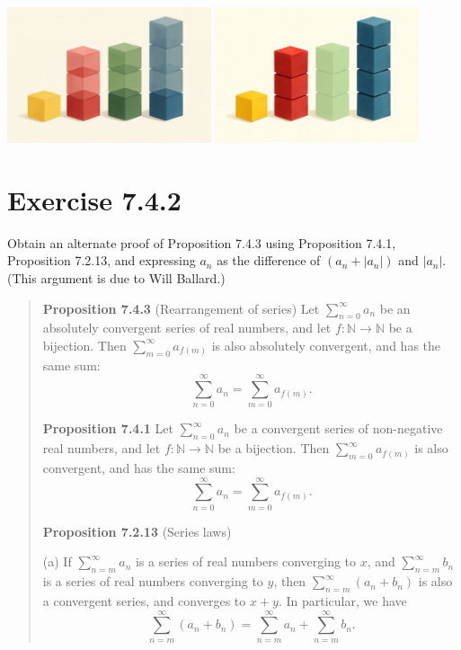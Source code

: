 \documentclass{article}
\begin{document}
\includegraphics[width=0.45\textwidth]{count-by-layer.png}
\hfil
\includegraphics[width=0.45\textwidth]{count-by-pile.png}

\section{Exercise 7.4.2}
Obtain an alternate proof of Proposition 7.4.3 using Proposition 7.4.1,
Proposition 7.2.13, and expressing $a_n$ as the difference of $(a_n + |a_n|)$
and $|a_n|$. (This argument is due to Will Ballard.)

\begin{quotation}
    \textbf{Proposition 7.4.3} (Rearrangement of series) Let $\sum_{n=0}^{\infty} a_n$
    be an absolutely convergent series of real numbers, and let $f: \mathbb{N} \to \mathbb{N}$
    be a bijection.
    Then $\sum_{m=0}^{\infty} a_{f(m)}$ is also absolutely convergent, and has the
    same sum:
    \[
        \sum_{n=0}^{\infty} a_n = \sum_{m=0}^{\infty} a_{f(m)}.
    \]

    \textbf{Proposition 7.4.1} Let $\sum_{n=0}^{\infty} a_n$ be a convergent series
    of non-negative real numbers, and let $f: \mathbb{N} \to \mathbb{N}$ be a bijection.
    Then $\sum_{m=0}^{\infty} a_{f(m)}$ is also convergent, and has the same sum:
    \[
        \sum_{n=0}^{\infty} a_n = \sum_{m=0}^{\infty} a_{f(m)}.
    \]

    \textbf{Proposition 7.2.13} (Series laws)

    (a) If $\sum_{n=m}^{\infty} a_n$ is a series of real numbers converging to $x$,
    and $\sum_{n=m}^{\infty} b_n$ is a series of real numbers converging to $y$, then
    $\sum_{n=m}^{\infty} (a_n + b_n)$ is also a convergent series, and converges to $x + y$.
    In particular, we have
    \[
        \sum_{n=m}^{\infty} (a_n + b_n) = \sum_{n=m}^{\infty} a_n + \sum_{n=m}^{\infty} b_n.
    \]
\end{quotation}
\end{document}
